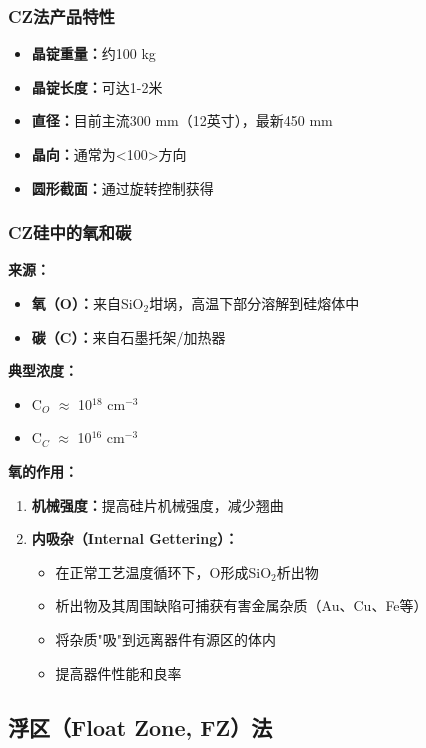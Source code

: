 \documentclass[UTF8,12pt,a4paper]{ctexart}
\begin{document}
\subsubsection{CZ法产品特性}

\begin{itemize}
    \item \textbf{晶锭重量：}约100 kg
    \item \textbf{晶锭长度：}可达1-2米
    \item \textbf{直径：}目前主流300 mm（12英寸），最新450 mm
    \item \textbf{晶向：}通常为<100>方向
    \item \textbf{圆形截面：}通过旋转控制获得
\end{itemize}

\subsubsection{CZ硅中的氧和碳}

\textbf{来源：}
\begin{itemize}
    \item \textbf{氧（O）：}来自SiO$_2$坩埚，高温下部分溶解到硅熔体中
    \item \textbf{碳（C）：}来自石墨托架/加热器
\end{itemize}

\textbf{典型浓度：}
\begin{itemize}
    \item C$_O$ $\approx$ 10$^{18}$ cm$^{-3}$
    \item C$_C$ $\approx$ 10$^{16}$ cm$^{-3}$
\end{itemize}

\textbf{氧的作用：}
\begin{enumerate}
    \item \textbf{机械强度：}提高硅片机械强度，减少翘曲
    \item \textbf{内吸杂（Internal Gettering）：}
    \begin{itemize}
        \item 在正常工艺温度循环下，O形成SiO$_2$析出物
        \item 析出物及其周围缺陷可捕获有害金属杂质（Au、Cu、Fe等）
        \item 将杂质"吸"到远离器件有源区的体内
        \item 提高器件性能和良率
    \end{itemize}
\end{enumerate}

\subsection{浮区（Float Zone, FZ）法}
\end{document}
